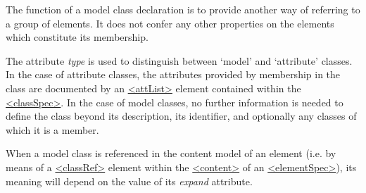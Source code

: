 The function of a model class declaration is to provide another way of referring to a group of elements. It does not confer any other properties on the elements which constitute its membership. \par
The attribute {\itshape type} is used to distinguish between ‘model’ and ‘attribute’ classes. In the case of attribute classes, the attributes provided by membership in the class are documented by an \hyperref[TEI.attList]{<attList>} element contained within the \hyperref[TEI.classSpec]{<classSpec>}. In the case of model classes, no further information is needed to define the class beyond its description, its identifier, and optionally any classes of which it is a member.\par
When a model class is referenced in the content model of an element (i.e. by means of a \hyperref[TEI.classRef]{<classRef>} element within the \hyperref[TEI.content]{<content>} of an \hyperref[TEI.elementSpec]{<elementSpec>}), its meaning will depend on the value of its {\itshape expand} attribute.\par
